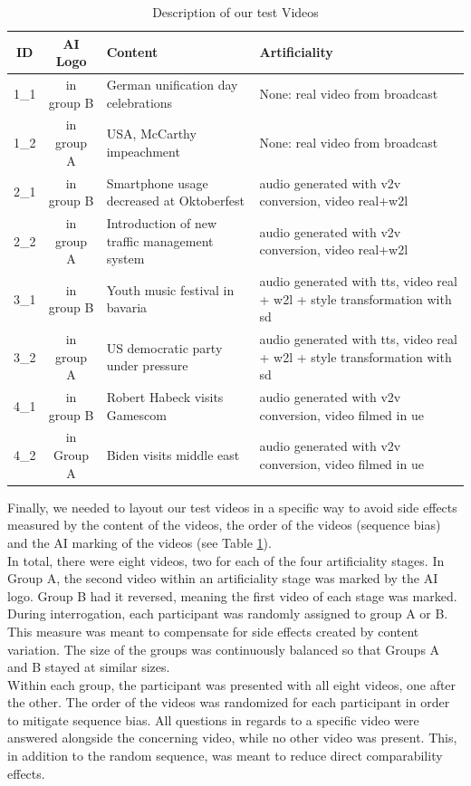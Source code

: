 \documentclass[
  a4paper,  %
  twoside,  %
  bibliography=totoc,
  headsepline,
  cleardoublepage=empty,
  parskip=half,
  draft=false
]{scrbook}
\begin{document}
\begin{table}[h]
  \centering
  \begin{tabularx}{\linewidth}{c|c|X|X}
    \textbf{ID} & \textbf{AI Logo} & \textbf{Content} & \textbf{Artificiality}\\
    \midrule
    1\_1 & in group B & German unification day celebrations  & None: real video from broadcast \\
    \midrule
    1\_2 & in group A & USA, McCarthy impeachment  & None: real video from broadcast \\
    \midrule
    2\_1 & in group B & Smartphone usage decreased at Oktoberfest  & audio generated with \gls{v2v} conversion, video real+\gls{w2l} \\
    \midrule
    2\_2 & in group A & Introduction of new traffic management system  & audio generated with \gls{v2v} conversion, video real+\gls{w2l} \\
    \midrule
    3\_1 & in group B & Youth music festival in bavaria  & audio generated with \gls{tts}, video real + \gls{w2l} + style transformation with \gls{sd} \\
    \midrule
    3\_2 & in group A & US democratic party under pressure  & audio generated with \gls{tts}, video real + \gls{w2l} + style transformation with \gls{sd} \\
    \midrule
    4\_1 & in group B & Robert Habeck visits Gamescom  & audio generated with \gls{v2v} conversion, video filmed in \gls{ue} \\
    \midrule
    4\_2 & in Group A & Biden visits middle east  & audio generated with \gls{v2v} conversion, video filmed in \gls{ue} \\
  \end{tabularx}
  \caption{Description of our test Videos}
  \label{tab:video-table}
\end{table}

Finally, we needed to layout our test videos in a specific way to avoid side effects measured by the content of the videos, the order of the videos (sequence bias) and the AI marking of the videos (see Table \ref{tab:video-table}). \\

In total, there were eight videos, two for each of the four artificiality stages. In Group A, the second video within an artificiality stage was marked by the AI logo. Group B had it reversed, meaning the first video of each stage was marked. \\
During interrogation, each participant was randomly assigned to group A or B. This measure was meant to compensate for side effects created by content variation. The size of the groups was continuously balanced so that Groups A and B stayed at similar sizes. \\
Within each group, the participant was presented with all eight videos, one after the other. The order of the videos was randomized for each participant in order to mitigate sequence bias. All questions in regards to a specific video were answered alongside the concerning video, while no other video was present. This, in addition to the random sequence, was meant to reduce direct comparability effects.
\end{document}
